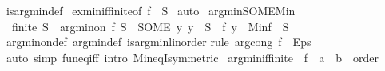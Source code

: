 \begin{isabellebody}
%
\isadelimproof
%
\endisadelimproof
%
\isatagproof
{}\isamarkupfalse%
\ is{\isacharunderscore}{\kern0pt}arg{\isacharunderscore}{\kern0pt}min{\isacharunderscore}{\kern0pt}def\isanewline
{}\isamarkupfalse%
\ ex{\isacharunderscore}{\kern0pt}min{\isacharunderscore}{\kern0pt}if{\isacharunderscore}{\kern0pt}finite{\isacharbrackleft}{\kern0pt}of\ {\isachardoublequoteopen}f\ {\isacharbackquote}{\kern0pt}\ S{\isachardoublequoteclose}{\isacharbrackright}{\kern0pt}\isanewline
{}\isamarkupfalse%
\ auto%
\endisatagproof
{\isafoldproof}%
%
\isadelimproof
\isanewline
%
\endisadelimproof
\isanewline
{}\isamarkupfalse%
\ arg{\isacharunderscore}{\kern0pt}min{\isacharunderscore}{\kern0pt}SOME{\isacharunderscore}{\kern0pt}Min{\isacharcolon}{\kern0pt}\isanewline
\ \ {\isachardoublequoteopen}finite\ S\ {\isasymLongrightarrow}\ arg{\isacharunderscore}{\kern0pt}min{\isacharunderscore}{\kern0pt}on\ f\ S\ {\isacharequal}{\kern0pt}\ {\isacharparenleft}{\kern0pt}SOME\ y{\isachardot}{\kern0pt}\ y\ {\isasymin}\ S\ {\isasymand}\ f\ y\ {\isacharequal}{\kern0pt}\ Min{\isacharparenleft}{\kern0pt}f\ {\isacharbackquote}{\kern0pt}\ S{\isacharparenright}{\kern0pt}{\isacharparenright}{\kern0pt}{\isachardoublequoteclose}\isanewline
%
\isadelimproof
%
\endisadelimproof
%
\isatagproof
{}\isamarkupfalse%
\ arg{\isacharunderscore}{\kern0pt}min{\isacharunderscore}{\kern0pt}on{\isacharunderscore}{\kern0pt}def\ arg{\isacharunderscore}{\kern0pt}min{\isacharunderscore}{\kern0pt}def\ is{\isacharunderscore}{\kern0pt}arg{\isacharunderscore}{\kern0pt}min{\isacharunderscore}{\kern0pt}linorder\isanewline
{}\isamarkupfalse%
{\isacharparenleft}{\kern0pt}rule\ arg{\isacharunderscore}{\kern0pt}cong{\isacharbrackleft}{\kern0pt}\ f\ {\isacharequal}{\kern0pt}\ Eps{\isacharbrackright}{\kern0pt}{\isacharparenright}{\kern0pt}\isanewline
{}\isamarkupfalse%
\ {\isacharparenleft}{\kern0pt}auto\ simp{\isacharcolon}{\kern0pt}\ fun{\isacharunderscore}{\kern0pt}eq{\isacharunderscore}{\kern0pt}iff\ intro{\isacharcolon}{\kern0pt}\ Min{\isacharunderscore}{\kern0pt}eqI{\isacharbrackleft}{\kern0pt}symmetric{\isacharbrackright}{\kern0pt}{\isacharparenright}{\kern0pt}\isanewline
{}\isamarkupfalse%
%
\endisatagproof
{\isafoldproof}%
%
\isadelimproof
\isanewline
%
\endisadelimproof
\isanewline
{}\isamarkupfalse%
\ arg{\isacharunderscore}{\kern0pt}min{\isacharunderscore}{\kern0pt}if{\isacharunderscore}{\kern0pt}finite{\isacharcolon}{\kern0pt}\ \ f\ {\isacharcolon}{\kern0pt}{\isacharcolon}{\kern0pt}\ {\isachardoublequoteopen}{\isacharprime}{\kern0pt}a\ {\isasymRightarrow}\ {\isacharprime}{\kern0pt}b\ {\isacharcolon}{\kern0pt}{\isacharcolon}{\kern0pt}\ order{\isachardoublequoteclose}\isanewline

\end{isabellebody}
